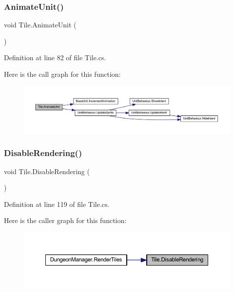 \subsubsection{\texorpdfstring{AnimateUnit()}{AnimateUnit()}}
{\footnotesize\ttfamily void Tile.\+Animate\+Unit (\begin{DoxyParamCaption}{ }\end{DoxyParamCaption})}



Definition at line 82 of file Tile.\+cs.

Here is the call graph for this function\+:
\nopagebreak
\begin{figure}[H]
\begin{center}
\leavevmode
\includegraphics[width=350pt]{class_tile_a87c523416006468a2791d61bf3be54ca_cgraph}
\end{center}
\end{figure}
\mbox{\label{class_tile_abf58797ff0c2df3eddfc9854c3f61dd2}} 
\subsubsection{\texorpdfstring{DisableRendering()}{DisableRendering()}}
{\footnotesize\ttfamily void Tile.\+Disable\+Rendering (\begin{DoxyParamCaption}{ }\end{DoxyParamCaption})}



Definition at line 119 of file Tile.\+cs.

Here is the caller graph for this function\+:
\nopagebreak
\begin{figure}[H]
\begin{center}
\leavevmode
\includegraphics[width=350pt]{class_tile_abf58797ff0c2df3eddfc9854c3f61dd2_icgraph}
\end{center}
\end{figure}
\mbox{\label{class_tile_a1baa5fe3ab8f887e8985a85fba21210a}} 
